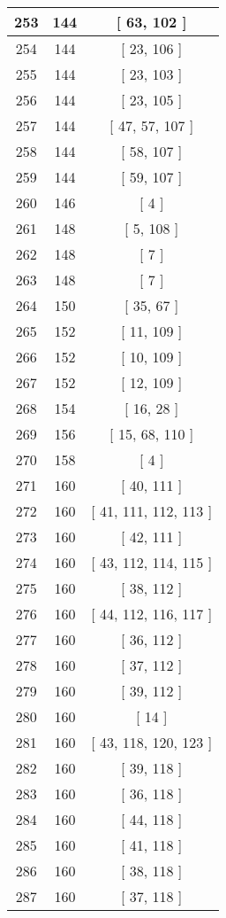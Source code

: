 \begin{center}
\begin{longtable}[H]{|| c c c ||}
\hline
253 & 144 & [ 63, 102 ] \\ 
\hline
254 & 144 & [ 23, 106 ] \\ 
\hline
255 & 144 & [ 23, 103 ] \\ 
\hline
256 & 144 & [ 23, 105 ] \\ 
\hline
257 & 144 & [ 47, 57, 107 ] \\ 
\hline
258 & 144 & [ 58, 107 ] \\ 
\hline
259 & 144 & [ 59, 107 ] \\ 
\hline
260 & 146 & [ 4 ] \\ 
\hline
261 & 148 & [ 5, 108 ] \\ 
\hline
262 & 148 & [ 7 ] \\ 
\hline
263 & 148 & [ 7 ] \\ 
\hline
264 & 150 & [ 35, 67 ] \\ 
\hline
265 & 152 & [ 11, 109 ] \\ 
\hline
266 & 152 & [ 10, 109 ] \\ 
\hline
267 & 152 & [ 12, 109 ] \\ 
\hline
268 & 154 & [ 16, 28 ] \\ 
\hline
269 & 156 & [ 15, 68, 110 ] \\ 
\hline
270 & 158 & [ 4 ] \\ 
\hline
271 & 160 & [ 40, 111 ] \\ 
\hline
272 & 160 & [ 41, 111, 112, 113 ] \\ 
\hline
273 & 160 & [ 42, 111 ] \\ 
\hline
274 & 160 & [ 43, 112, 114, 115 ] \\ 
\hline
275 & 160 & [ 38, 112 ] \\ 
\hline
276 & 160 & [ 44, 112, 116, 117 ] \\ 
\hline
277 & 160 & [ 36, 112 ] \\ 
\hline
278 & 160 & [ 37, 112 ] \\ 
\hline
279 & 160 & [ 39, 112 ] \\ 
\hline
280 & 160 & [ 14 ] \\ 
\hline
281 & 160 & [ 43, 118, 120, 123 ] \\ 
\hline
282 & 160 & [ 39, 118 ] \\ 
\hline
283 & 160 & [ 36, 118 ] \\ 
\hline
284 & 160 & [ 44, 118 ] \\ 
\hline
285 & 160 & [ 41, 118 ] \\ 
\hline
286 & 160 & [ 38, 118 ] \\ 
\hline
287 & 160 & [ 37, 118 ] \\ 

\end{longtable}
\end{center}
